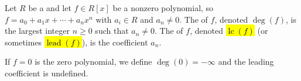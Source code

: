 \begin{definition} \label{definition:degree_and_leading_coefficient_of_a_polynomial}
Let $R$ be a  and let $f \in R[x]$ be a nonzero polynomial, so $f = a_0 + a_1 x + \cdots + a_n x^n$ with $a_i \in R$ and $a_n \neq 0$. The  of $f$, denoted $\deg(f)$, is the largest integer $n \geq 0$ such that $a_n \neq 0$. The  of $f$, denoted \hl{$\operatorname{lc}(f)$} (or sometimes \hl{$\operatorname{lead}(f)$}), is the coefficient $a_n$.

If $f = 0$ is the zero polynomial, we define $\deg(0) = -\infty$ and the leading coefficient is undefined.
\end{definition}
